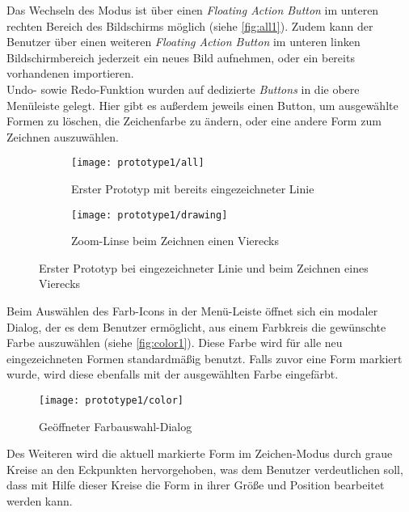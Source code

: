 Das Wechseln des Modus ist über einen \emph{Floating Action Button} im unteren rechten Bereich des Bildschirms möglich (siehe \autoref{fig:all1}).
Zudem kann der Benutzer über einen weiteren \emph{Floating Action Button} im unteren linken Bildschirmbereich jederzeit ein neues Bild aufnehmen, oder ein bereits vorhandenen importieren. \\

Undo- sowie Redo-Funktion wurden auf dedizierte \emph{Buttons} in die obere Menüleiste gelegt.
Hier gibt es außerdem jeweils einen Button, um ausgewählte Formen zu löschen, die Zeichenfarbe zu ändern, oder eine andere Form zum Zeichnen auszuwählen. \\

\begin{figure}[h]
  \begin{subfigure}[t]{0.4\textwidth}
    \texttt{[image: prototype1/all]}
    \caption{Erster Prototyp mit bereits eingezeichneter Linie}
    \label{fig:all1}
  \end{subfigure}
  \begin{subfigure}[t]{0.4\textwidth}
    \texttt{[image: prototype1/drawing]}
    \caption{Zoom-Linse beim Zeichnen einen Vierecks}
    \label{fig:draw1}
  \end{subfigure}
  \centering
  \caption{Erster Prototyp bei eingezeichneter Linie und beim Zeichnen eines Vierecks}
\end{figure}

\noindent
Beim Auswählen des Farb-Icons in der Menü-Leiste öffnet sich ein modaler Dialog, der es dem Benutzer ermöglicht, aus einem Farbkreis die gewünschte Farbe auszuwählen (siehe \autoref{fig:color1}).
Diese Farbe wird für alle neu eingezeichneten Formen standardmäßig benutzt.
Falls zuvor eine Form markiert wurde, wird diese ebenfalls mit der ausgewählten Farbe eingefärbt. \\

\begin{wrapfigure}{R}{0.5\textwidth}
  \centering
  \texttt{[image: prototype1/color]}
  \caption{Geöffneter Farbauswahl-Dialog}
  \label{fig:color1}
\end{wrapfigure}

Des Weiteren wird die aktuell markierte Form im Zeichen-Modus durch graue Kreise an den Eckpunkten hervorgehoben, was dem Benutzer verdeutlichen soll, dass mit Hilfe dieser Kreise die Form in ihrer Größe und Position bearbeitet werden kann. \\

